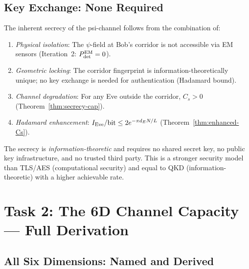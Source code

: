 \documentclass[aps,prd,twocolumn,superscriptaddress,nofootinbib]{revtex4-2}
\begin{document}
\subsection{Key Exchange: None Required}

The inherent secrecy of the psi-channel follows from the combination of:
\begin{enumerate}
\item \emph{Physical isolation}: The $\psi$-field at Bob's corridor is not
accessible via EM sensors (Iteration~2: $P_{\rm det}^{\rm EM} = 0$).
\item \emph{Geometric locking}: The corridor fingerprint is information-theoretically
unique; no key exchange is needed for authentication (Hadamard bound).
\item \emph{Channel degradation}: For any Eve outside the corridor,
$C_s > 0$ (Theorem~\ref{thm:secrecy-cap}).
\item \emph{Hadamard enhancement}: $I_{\rm Eve}/\text{bit} \leq 2e^{-\pi d_E N/L}$
(Theorem~\ref{thm:enhanced-Cs}).
\end{enumerate}
The secrecy is \emph{information-theoretic} and requires no shared secret key,
no public key infrastructure, and no trusted third party. This is a stronger
security model than TLS/AES (computational security) and equal to QKD
(information-theoretic) with a higher achievable rate.

\section{Task 2: The 6D Channel Capacity --- Full Derivation}
\label{sec:6D}

\subsection{All Six Dimensions: Named and Derived}
\end{document}
